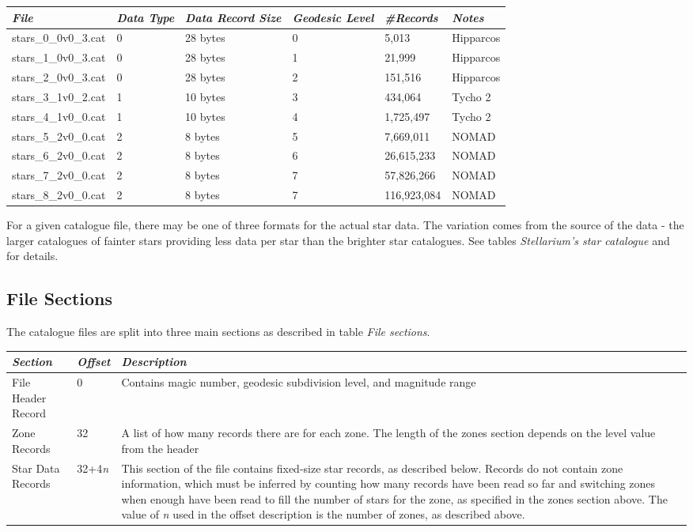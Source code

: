\begin{longtabu} to \textwidth {l X X X X X}
\toprule
\emph{File} & \emph{Data Type} & \emph{Data Record Size} &
\emph{Geodesic Level} & \emph{\#Records} & \emph{Notes}\tabularnewline
\midrule
stars\_0\_0v0\_3.cat & 0 & 28 bytes & 0 & 5,013 &
Hipparcos\tabularnewline
stars\_1\_0v0\_3.cat & 0 & 28 bytes & 1 & 21,999 &
Hipparcos\tabularnewline
stars\_2\_0v0\_3.cat & 0 & 28 bytes & 2 & 151,516 &
Hipparcos\tabularnewline
stars\_3\_1v0\_2.cat & 1 & 10 bytes & 3 & 434,064 & Tycho 2\tabularnewline
stars\_4\_1v0\_0.cat & 1 & 10 bytes & 4 & 1,725,497 &
Tycho 2\tabularnewline
stars\_5\_2v0\_0.cat & 2 & 8 bytes & 5 & 7,669,011 &
NOMAD\tabularnewline
stars\_6\_2v0\_0.cat & 2 & 8 bytes & 6 & 26,615,233 &
NOMAD\tabularnewline
stars\_7\_2v0\_0.cat & 2 & 8 bytes & 7 & 57,826,266 &
NOMAD\tabularnewline
stars\_8\_2v0\_0.cat & 2 & 8 bytes & 7 & 116,923,084 &
NOMAD\tabularnewline
\bottomrule
\end{longtabu}

For a given catalogue file, there may be one of three formats for the
actual star data. The variation comes from the source of the data - the
larger catalogues of fainter stars providing less data per star than the
brighter star catalogues. See tables \emph{Stellarium's star catalogue}
and for details.

\subsection{File Sections}\label{file-sections}

The catalogue files are split into three main sections as described in
table \emph{File sections}.

\begin{longtabu} to \textwidth {l l X}
\toprule
\emph{Section} & \emph{Offset} & \emph{Description}\tabularnewline
\midrule
File Header Record & 0 & Contains magic number, geodesic subdivision
level, and magnitude range\tabularnewline
\midrule
Zone Records & 32 & A list of how many records there are for each zone.
The length of the zones section depends on the level value from the
header\tabularnewline
\midrule
Star Data Records & 32+4\emph{n} & This section of the file contains
fixed-size star records, as described below. Records do not contain zone
information, which must be inferred by counting how many records have
been read so far and switching zones when enough have been read to fill
the number of stars for the zone, as specified in the zones section
above. The value of \emph{n} used in the offset description is the
number of zones, as described above.\tabularnewline
\bottomrule
\end{longtabu}

